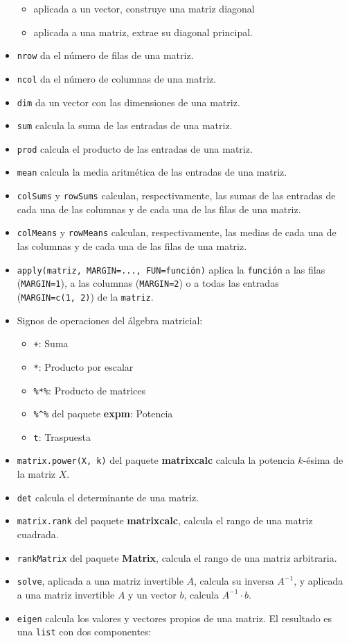 \documentclass[
]{book}
\providecommand{\tightlist}{%
  \setlength{\itemsep}{0pt}\setlength{\parskip}{0pt}}
\theoremstyle{definition}
\theoremstyle{definition}
\theoremstyle{definition}
\theoremstyle{remark}
\begin{document}
\begin{itemize}
  \begin{itemize}
  \tightlist
  \item
    aplicada a un vector, construye una matriz diagonal
  \item
    aplicada a una matriz, extrae su diagonal principal.
  \end{itemize}
\item
  \texttt{nrow} da el número de filas de una matriz.
\item
  \texttt{ncol} da el número de columnas de una matriz.
\item
  \texttt{dim} da un vector con las dimensiones de una matriz.
\item
  \texttt{sum} calcula la suma de las entradas de una matriz.
\item
  \texttt{prod} calcula el producto de las entradas de una matriz.
\item
  \texttt{mean} calcula la media aritmética de las entradas de una matriz.
\item
  \texttt{colSums} y \texttt{rowSums} calculan, respectivamente, las sumas de las entradas de cada una de las columnas y de cada una de las filas de una matriz.
\item
  \texttt{colMeans} y \texttt{rowMeans} calculan, respectivamente, las medias de cada una de las columnas y de cada una de las filas de una matriz.
\item
  \texttt{apply(matriz,\ MARGIN=...,\ FUN=función)} aplica la \texttt{función} a las filas (\texttt{MARGIN=1}), a las columnas (\texttt{MARGIN=2}) o a todas las entradas (\texttt{MARGIN=c(1,\ 2)}) de la \texttt{matriz}.
\item
  Signos de operaciones del álgebra matricial:

  \begin{itemize}
  \tightlist
  \item
    \texttt{+}: Suma
  \item
    \texttt{*}: Producto por escalar
  \item
    \texttt{\%*\%}: Producto de matrices
  \item
    \texttt{\%\^{}\%} del paquete \textbf{expm}: Potencia
  \item
    \texttt{t}: Traspuesta
  \end{itemize}
\item
  \texttt{matrix.power(X,\ k)} del paquete \textbf{matrixcalc} calcula la potencia \(k\)-ésima de la matriz \(X\).
\item
  \texttt{det} calcula el determinante de una matriz.
\item
  \texttt{matrix.rank} del paquete \textbf{matrixcalc}, calcula el rango de una matriz cuadrada.
\item
  \texttt{rankMatrix} del paquete \textbf{Matrix}, calcula el rango de una matriz arbitraria.
\item
  \texttt{solve}, aplicada a una matriz invertible \(A\), calcula su inversa \(A^{-1}\), y aplicada a una matriz invertible \(A\) y un vector \(b\), calcula \(A^{-1}\cdot b\).
\item
  \texttt{eigen} calcula los valores y vectores propios de una matriz. El resultado es una \texttt{list} con dos componentes:


\end{itemize}
\end{document}
